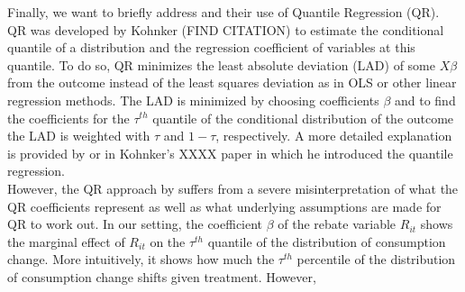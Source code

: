 Finally, we want to briefly address \cite{ms_14} and their use of Quantile Regression (QR). QR was developed by Kohnker (FIND CITATION) to estimate the conditional quantile of a distribution and the regression coefficient of variables at this quantile. To do so, QR minimizes the least absolute deviation (LAD) of some $X\beta$ from the outcome instead of the least squares deviation as in OLS or other linear regression methods. The LAD is minimized by choosing coefficients $\beta$ and to find the coefficients for the $\tau^{th}$ quantile of the conditional distribution of the outcome the LAD is weighted with $\tau$ and $1-\tau$, respectively. A more detailed explanation is provided by \cite{ms_14} or in Kohnker's XXXX paper in which he introduced the quantile regression. \\
However, the QR approach by \cite{ms_14} suffers from a severe misinterpretation of what the QR coefficients represent as well as what underlying assumptions are made for QR to work out. In our setting, the coefficient $\beta$ of the rebate variable $R_{it}$ shows the marginal effect of $R_{it}$ on the $\tau^{th}$ quantile of the distribution of consumption change. More intuitively, it shows how much the $\tau^{th}$ percentile of the distribution of consumption change shifts given treatment. However, 

